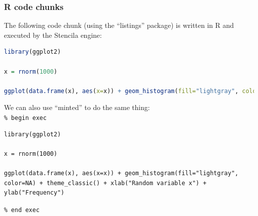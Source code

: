 \documentclass[12pt]{article}
\begin{document}
\subsubsection*{R code chunks}

The following code chunk (using the ``listings'' package) is written
in R and executed by the Stencila engine:\\

\begin{lstlisting}[language=R, breaklines=true, showspaces=false,
  showstringspaces=false, tabsize=4, captionpos=b, frame=single,
  caption={Histogram of 1,000 random draws from $\mathcal{N}$(0.0, 1.0).}]
library(ggplot2)
  
x = rnorm(1000)

ggplot(data.frame(x), aes(x=x)) + geom_histogram(fill="lightgray", color=NA) + theme_classic() + xlab("Random variable x") + ylab("Frequency")
\end{lstlisting}

We can also use ``minted'' to do the same thing:\\

\texttt{\% begin exec}
\begin{verbatim}
library(ggplot2)
  
x = rnorm(1000)

ggplot(data.frame(x), aes(x=x)) + geom_histogram(fill="lightgray", color=NA) + theme_classic() + xlab("Random variable x") + ylab("Frequency")
\end{verbatim}
\texttt{\% end exec}
\end{document}
